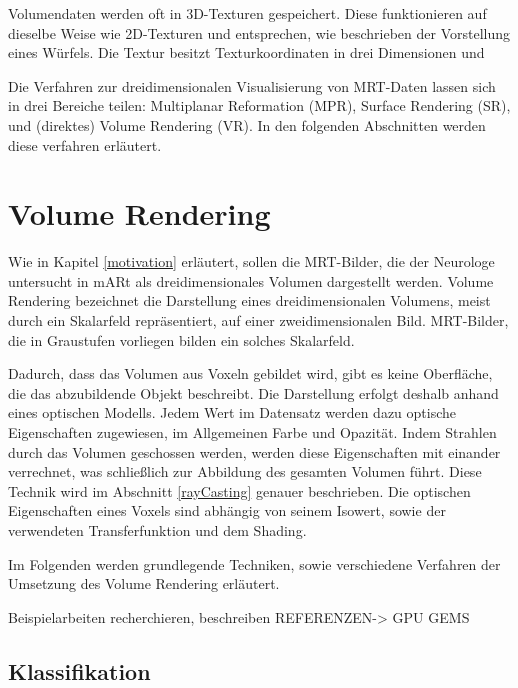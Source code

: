 Volumendaten werden oft in 3D-Texturen gespeichert. Diese funktionieren auf dieselbe Weise wie 2D-Texturen und entsprechen, wie beschrieben der Vorstellung eines Würfels. Die Textur besitzt Texturkoordinaten in drei Dimensionen und 

Die Verfahren zur dreidimensionalen Visualisierung von MRT-Daten lassen sich in drei Bereiche teilen: Multiplanar Reformation (MPR), Surface Rendering (SR), und (direktes) Volume Rendering (VR). \citet{Zhang10} In den folgenden Abschnitten werden diese verfahren erläutert.

\section{Volume Rendering}							  %
Wie in Kapitel \ref{motivation} erläutert, sollen die MRT-Bilder, die der Neurologe untersucht in mARt als dreidimensionales Volumen dargestellt werden. Volume Rendering bezeichnet die Darstellung eines dreidimensionalen Volumens, meist durch ein Skalarfeld repräsentiert, auf einer zweidimensionalen Bild. MRT-Bilder, die in Graustufen vorliegen bilden ein solches Skalarfeld. 

Dadurch, dass das Volumen aus Voxeln gebildet wird, gibt es keine Oberfläche, die das abzubildende Objekt beschreibt. Die Darstellung erfolgt deshalb anhand eines optischen Modells. Jedem Wert im Datensatz werden dazu optische Eigenschaften zugewiesen, im Allgemeinen Farbe und Opazität. Indem Strahlen durch das Volumen geschossen werden, werden diese Eigenschaften mit einander verrechnet, was schließlich zur Abbildung des gesamten Volumen führt. Diese Technik wird im Abschnitt \ref{rayCasting} genauer beschrieben.
Die optischen Eigenschaften eines Voxels sind abhängig von seinem Isowert, sowie der verwendeten Transferfunktion und dem Shading. 

Im Folgenden werden grundlegende Techniken, sowie verschiedene Verfahren der Umsetzung des Volume Rendering erläutert.

\citet{Kaufman03}
\citet{kniss02}
Beispielarbeiten recherchieren, beschreiben
REFERENZEN-> GPU GEMS

\subsection{Klassifikation}

